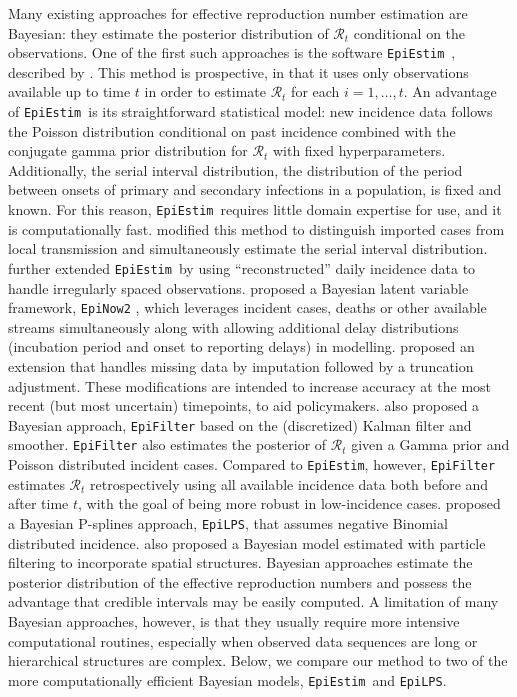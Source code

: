 \documentclass[10pt,letterpaper]{article}
\def\EpiEstim{\texttt{EpiEstim}}
\def\EpiLPS{\texttt{EpiLPS}}
\def\calR{\mathcal{R}}
\newcommand{\citep}[1]{\cite{#1}}
\begin{document}
Many existing approaches for effective reproduction number estimation are
Bayesian: they estimate the posterior distribution of $\calR_t$ conditional on
the observations. One of the first such approaches is the software \EpiEstim\
\citep{cori2020package}, described by \cite{cori2013new}. This method is
prospective, in that it uses only observations available up to time $t$ in order to
estimate $\calR_t$ for each $i = 1,\ldots, t$. An advantage of \EpiEstim\ is its
straightforward statistical model: new incidence data follows the Poisson
distribution conditional on past incidence combined with the conjugate gamma prior
distribution for $\calR_t$ with fixed hyperparameters. Additionally, the serial
interval distribution, the distribution of the period between onsets of primary 
and secondary infections in a population, is fixed and known. For this reason, 
\EpiEstim\ requires little domain expertise for use, and it is computationally fast.
\cite{thompson2019improved} modified this method to distinguish imported cases from 
local transmission and simultaneously estimate the serial interval distribution.
\cite{nash2023estimating} further extended \EpiEstim\ by using
``reconstructed'' daily incidence data to handle irregularly spaced observations.
\cite{abbott2020estimating} proposed a Bayesian latent variable framework,
\texttt{EpiNow2} \citep{EpiNow2}, which leverages incident cases, deaths or
other available streams simultaneously along with allowing additional delay
distributions (incubation period and onset to reporting delays) in modelling.  
\cite{lison2023generative} proposed an extension that handles missing data by
imputation followed by a truncation adjustment. These modifications are intended
to increase accuracy at the most recent (but most uncertain) timepoints, to aid 
policymakers. \cite{parag2021improved} also proposed a Bayesian approach, 
\texttt{EpiFilter} based on the (discretized) Kalman filter and smoother. 
\texttt{EpiFilter} also estimates the posterior of $\calR_t$ given a Gamma 
prior and Poisson distributed incident cases. Compared to \EpiEstim, 
however, \texttt{EpiFilter} estimates $\calR_t$ retrospectively using all 
available incidence data both before and after time $t$, with the goal of being 
more robust in low-incidence cases. \cite{gressani2022epilps} proposed a 
Bayesian P-splines approach, \EpiLPS, that assumes negative Binomial distributed 
incidence. \cite{trevisin2023spatially} also proposed a Bayesian model estimated 
with particle filtering to incorporate spatial structures. 
Bayesian approaches estimate the posterior distribution of the effective
reproduction numbers and possess the advantage that credible intervals may be
easily computed. A limitation of many Bayesian approaches, however, is that they
usually require more intensive computational routines, especially when observed
data sequences are long or hierarchical structures are complex.  Below, we
compare our method to two of the more computationally efficient Bayesian models,
\EpiEstim\ and \EpiLPS. 
\end{document}
